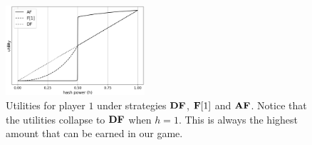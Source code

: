 
\begin{figure}
 \centering
    \includegraphics[width=0.46\textwidth]{plots/test_AF.png}
    \caption{Utilities for player $1$ under strategies $\text{\rm {\bf DF}}$, $\text{\rm {\bf F}[{$1$}]}$ and $\text{\rm {\bf AF}}$. 
    Notice that the utilities collapse to $\text{\rm {\bf DF}}$ when $h = 1$. This is always the highest amount that can be earned in our game.}
        \label{fig-af-df-fo}
\end{figure}
%


